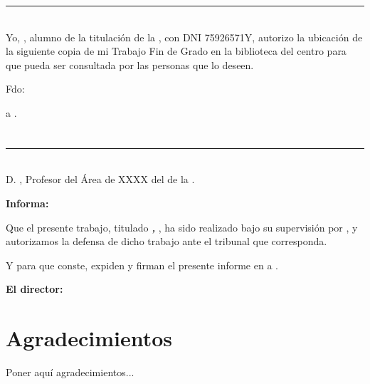 \noindent\rule[-1ex]{\textwidth}{2pt}\\[4.5ex]

Yo, \textbf{\myName}, alumno de la titulación \myDegree de la \textbf{\myFaculty}, con DNI 75926571Y, autorizo la ubicación de la siguiente copia de mi Trabajo Fin de Grado en la biblioteca del centro para que pueda ser consultada por las personas que lo deseen.

\vspace{6cm}

\noindent Fdo: \myName

\vspace{2cm}

\begin{flushright}
\myLocation a \myTime.
\end{flushright}


\chapter*{}
\thispagestyle{empty}

\noindent\rule[-1ex]{\textwidth}{2pt}\\[4.5ex]

D. \textbf{\myProf}, Profesor del Área de XXXX del \myDepartment de la \myUni.

\vspace{0.5cm}

\textbf{Informa:}

\vspace{0.5cm}

Que el presente trabajo, titulado \textit{\textbf{\myTitle, \mySubtitle}}, ha sido realizado bajo su supervisión por \textbf{\myName}, y autorizamos la defensa de dicho trabajo ante el tribunal que corresponda.

\vspace{0.5cm}

Y para que conste, expiden y firman el presente informe en \myLocation a \myTime.

\vspace{1cm}

\textbf{El director:}

\vspace{5cm}

\noindent \textbf{\myProf}

\chapter*{Agradecimientos}
\thispagestyle{empty}

\vspace{1cm}

Poner aquí agradecimientos...

